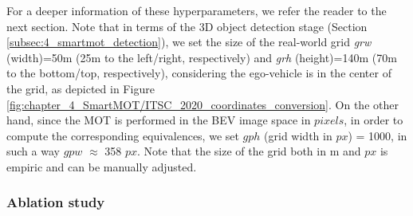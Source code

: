 For a deeper information of these hyperparameters, we refer the reader to the next section. Note that in terms of the 3D object detection stage (Section \ref{subsec:4_smartmot_detection}), we set the size of the real-world grid \textit{grw} (width)=50m (25m to the left/right, respectively) and \textit{grh} (height)=140m (70m to the bottom/top, respectively), considering the ego-vehicle is in the center of the grid, as depicted in Figure \ref{fig:chapter_4_SmartMOT/ITSC_2020_coordinates_conversion}. On the other hand, since the \ac{MOT} is performed in the \ac{BEV} image space in $pixels$, in order to compute the corresponding equivalences, we set $gph$ (grid width in $px$) = 1000, in such a way $gpw$ $\approx$ 358 $px$. Note that the size of the grid both in m and $px$ is empiric and can be manually adjusted.  


\subsubsection{Ablation study}
\label{subsubsec:4_mot_ablation}

